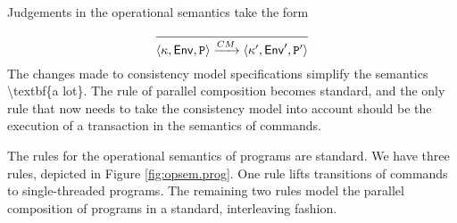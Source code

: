 Judgements in the operational semantics take the form 

\[
\infer{\langle \hh, \mathsf{Env}, \prog \rangle \xrightarrow{CM} \langle \hh', \mathsf{Env}', \prog' \rangle}{}
\]
\ac{The changes made to consistency model specifications simplify the semantics \textbf{a lot}. The rule of parallel 
composition becomes standard, and the only rule that now needs to take the consistency model into account 
should be the execution of a transaction in the semantics of commands.}

The rules for the operational semantics of programs are standard. We have three rules, depicted in 
Figure \ref{fig:opsem.prog}. One rule lifts transitions
 of commands to single-threaded programs.  The remaining two rules model the parallel composition of programs in 
 a standard, interleaving fashion.
